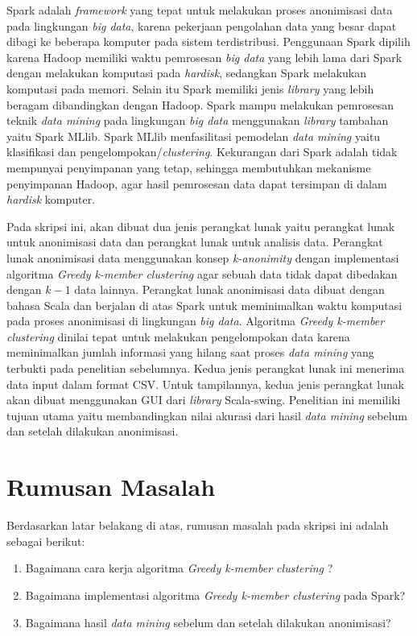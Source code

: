Spark adalah {\it framework} yang tepat untuk melakukan proses anonimisasi data pada lingkungan \textit{big data}, karena pekerjaan pengolahan data yang besar dapat dibagi ke beberapa komputer pada sistem terdistribusi. Penggunaan Spark dipilih karena Hadoop memiliki waktu pemrosesan \textit{big data} yang lebih lama dari Spark dengan melakukan komputasi pada \textit{hardisk}, sedangkan Spark melakukan komputasi pada memori. Selain itu Spark memiliki jenis \textit{library} yang lebih beragam dibandingkan dengan Hadoop. Spark  mampu melakukan pemrosesan teknik {\it data mining} pada lingkungan \textit{big data} menggunakan {\it library} tambahan yaitu Spark MLlib. Spark MLlib menfasilitasi pemodelan \textit{data mining} yaitu klasifikasi dan pengelompokan/\textit{clustering}. Kekurangan dari Spark adalah tidak mempunyai penyimpanan yang tetap, sehingga membutuhkan  mekanisme penyimpanan Hadoop, agar hasil pemrosesan data dapat tersimpan di dalam {\it hardisk} komputer.

Pada skripsi ini, akan dibuat dua jenis perangkat lunak yaitu perangkat lunak untuk anonimisasi data dan perangkat lunak untuk analisis data. Perangkat lunak anonimisasi data menggunakan konsep {\it k-anonimity} dengan implementasi algoritma \textit{Greedy k-member clustering} agar sebuah data tidak dapat dibedakan dengan $k-1$ data lainnya. Perangkat lunak anonimisasi data dibuat dengan bahasa Scala dan berjalan di atas Spark untuk meminimalkan waktu komputasi pada proses anonimisasi di lingkungan {\it big data}. Algoritma {\it Greedy k-member clustering} dinilai tepat untuk melakukan pengelompokan data karena meminimalkan jumlah informasi yang hilang saat proses {\it data mining} yang terbukti pada penelitian sebelumnya. Kedua jenis perangkat lunak ini menerima data input dalam format CSV. Untuk tampilannya, kedua jenis perangkat lunak akan dibuat menggunakan GUI dari \textit{library} Scala-swing. Penelitian ini memiliki tujuan utama yaitu membandingkan nilai akurasi dari hasil {\it data mining} sebelum dan setelah dilakukan anonimisasi.

\section{Rumusan Masalah}
\label{sec:rumusan}
Berdasarkan latar belakang di atas, rumusan masalah pada skripsi ini adalah sebagai berikut:
\begin{enumerate}
\item Bagaimana cara kerja algoritma {\it Greedy k-member clustering} ?
\item Bagaimana implementasi algoritma {\it Greedy k-member clustering} pada Spark?
\item Bagaimana hasil {\it data mining} sebelum dan setelah dilakukan anonimisasi?
\end{enumerate}

